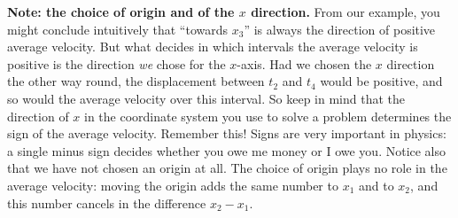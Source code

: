 \documentclass[11pt,a4paper]{article}
\begin{document}
\begin{aside}
\textbf{Note: the choice of origin and of the $x$ direction.} From our example, you might conclude
intuitively that ``towards $x_3$'' is always the direction of positive average velocity. But what
decides in which intervals the average velocity is positive is the direction \emph{we} chose for
the $x$-axis. Had we chosen the $x$ direction the other way round, the displacement between $t_2$
and $t_4$ would be positive, and so would the average velocity over this interval. So keep in mind
that the direction of $x$ in the coordinate system you use to solve a problem determines the sign
of the average velocity. Remember this! Signs are very important in physics: a single minus sign
decides whether you owe me money or I owe you. Notice also that we have not chosen an origin at
all. The choice of origin plays no role in the average velocity: moving the origin adds the same
number to $x_1$ and to $x_2$, and this number cancels in the difference $x_2 - x_1$.
\end{aside}
\end{document}
